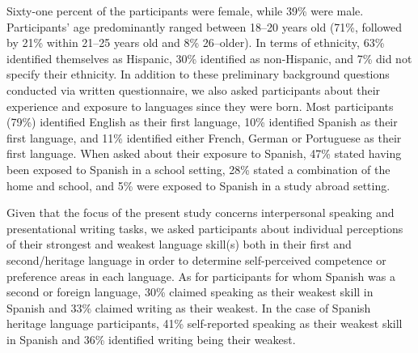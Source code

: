 \documentclass[output=paper]{langscibook}
\begin{document}
Sixty-one percent of the participants were female, while 39\% were male. Participants’ age predominantly ranged between 18--20 years old (71\%, followed by 21\% within 21--25 years old and 8\% 26--older). In terms of ethnicity, 63\% identified themselves as Hispanic, 30\% identified as non-Hispanic, and 7\% did not specify their ethnicity. In addition to these preliminary background questions conducted via written questionnaire, we also asked participants about their experience and exposure to languages since they were born. Most participants (79\%) identified English as their first language, 10\% identified Spanish as their first language, and 11\% identified either French, German or Portuguese as their first language. When asked about their exposure to Spanish, 47\% stated having been exposed to Spanish in a school setting, 28\% stated a combination of the home and school, and 5\% were exposed to Spanish in a study abroad setting.

Given that the focus of the present study concerns interpersonal speaking and presentational writing tasks, we asked participants about individual perceptions of their strongest and weakest language skill(s) both in their first and second/heritage language in order to determine self-perceived competence or preference areas in each language. As for participants for whom Spanish was a second or foreign language, 30\% claimed speaking as their weakest skill in Spanish and 33\% claimed writing as their weakest. In the case of Spanish heritage language participants, 41\% self-reported speaking as their weakest skill in Spanish and 36\% identified writing being their weakest.
\end{document}
